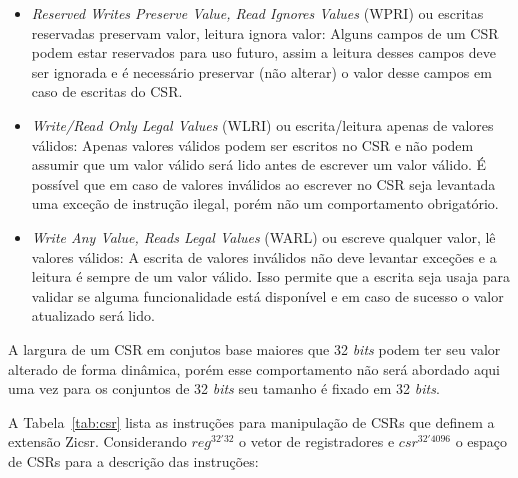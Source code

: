   \begin{itemize}
    \item \emph{Reserved Writes Preserve Value, Read Ignores Values} (WPRI) ou escritas reservadas preservam valor, leitura
          ignora valor: Alguns campos de um CSR podem estar reservados para uso futuro, assim a leitura desses campos deve
          ser ignorada e é necessário preservar (não alterar) o valor desse campos em caso de escritas do CSR.
    \item \emph{Write/Read Only Legal Values} (WLRI) ou escrita/leitura apenas de valores válidos: Apenas valores válidos podem
          ser escritos no CSR e não podem assumir que um valor válido será lido antes de escrever um valor válido. É possível que
          em caso de valores inválidos ao escrever no CSR seja levantada uma exceção de instrução ilegal, porém não um comportamento
          obrigatório.
    \item \emph{Write Any Value, Reads Legal Values} (WARL) ou escreve qualquer valor, lê valores válidos: A escrita de valores 
          inválidos não deve levantar exceções e a leitura é sempre de um valor válido. Isso permite que a escrita seja usaja
          para validar se alguma funcionalidade está disponível e em caso de sucesso o valor atualizado será lido.
  \end{itemize}

  A largura de um CSR em conjutos base maiores que 32 \emph{bits} podem ter seu valor alterado de forma dinâmica, porém
  esse comportamento não será abordado aqui uma vez para os conjuntos de 32 \emph{bits} seu tamanho é fixado em 32 \emph{bits}.

  A Tabela~\ref{tab:csr} lista as instruções para manipulação de CSRs que definem a extensão Zicsr.
  Considerando $reg^{32'32}$ o vetor de registradores e $csr^{32'4096}$ o espaço de CSRs para a descrição das instruções:

